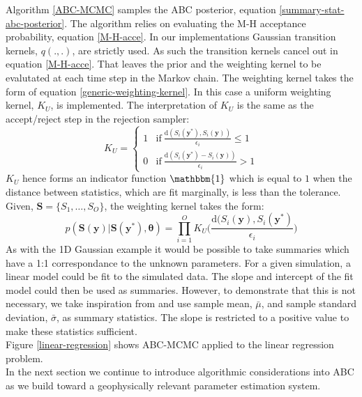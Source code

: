 Algorithm \ref{ABC-MCMC} samples the ABC posterior, equation \ref{summary-stat-abc-posterior}. The algorithm relies on evaluating the M-H acceptance probability, equation \ref{M-H-acce}. In our implementations Gaussian transition kernels, $q(.,.)$, are strictly used. As such the transition kernels cancel out in equation \ref{M-H-acce}. That leaves the prior and the weighting kernel to be evalutated at each time step in the Markov chain. The weighting kernel takes the form of equation \ref{generic-weighting-kernel}. In this case a uniform weighting kernel, $K_U$, is implemented. The interpretation of $K_U$ is the same as the accept/reject step in the rejection sampler: 
\begin{equation}
	K_U = 
	\begin{cases}
		1 & \text{if}\ 	\frac{\text{d}(S_i(\bm{y^*}),S_i(\bm{y}))}				{\epsilon_i} \leq 1\\
		0 & \text{if}\ \frac{\text{d}(S_i(\bm{y^*}) - S_i(\bm{y}))}				{\epsilon_i} > 1
	\end{cases}
\end{equation}
$K_U$ hence forms an indicator function $\mathbbm{1}$ which is equal to $1$ when the distance between statistics, which are fit marginally, is less than the tolerance. Given, $\bm{S} = \{S_1,\dots,S_O\}$, the weighting kernel takes the form:
\begin{equation}
	p(\bm{S}(\bm{y})|\bm{S}(\bm{y^*}),\bm{\theta}) = \prod_{i = 1}^{O} K_U\Big(\frac{\text{d}(S_i(\bm{y}),S_i(\bm{y^*})}{\epsilon_i}\Big)
	\label{weight-kernel}
\end{equation}
\noindent
As with the 1D Gaussian example it would be possible to take summaries which have a 1:1 correspondance to the unknown parameters. For a given simulation, a linear model could be fit to the simulated data. The slope and intercept of the fit model could then be used as summaries. However, to demonstrate that this is not necessary, we take inspiration from \citet{vrugt2013toward} and use sample mean, $\bar{\mu}$, and sample standard deviation, $\bar{\sigma}$, as summary statistics. The slope is restricted to a positive value to make these statistics sufficient. \\

Figure \ref{linear-regression} shows ABC-MCMC applied to the linear regression problem. \\

In the next section we continue to introduce algorithmic considerations into ABC as we build toward a geophysically relevant parameter estimation system. \\

